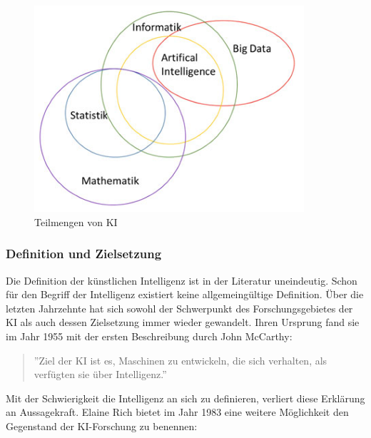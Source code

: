 \documentclass[a4paper,12pt, german]{report}
\begin{document}
\begin{figure}[H]
  \center
 \includegraphics[width=10cm]{images/KI-Teilmengen.png}
  \caption[Teilmengen von KI]{Teilmengen von KI \cite{17}}
\end{figure}


\subsubsection{Definition und Zielsetzung}
Die Definition der künstlichen Intelligenz ist in der Literatur uneindeutig. Schon für den Begriff der Intelligenz existiert keine allgemeingültige Definition. Über die letzten Jahrzehnte hat sich sowohl der Schwerpunkt des Forschungsgebietes der KI als auch dessen Zielsetzung immer wieder gewandelt. Ihren Ursprung fand sie im Jahr 1955 mit der ersten Beschreibung durch John McCarthy\cite{11}:
\begin{quote}
  ''Ziel der KI ist es, Maschinen zu entwickeln, die sich verhalten, als verfügten sie über Intelligenz.''
\end{quote}
Mit der Schwierigkeit die Intelligenz an sich zu definieren, verliert diese Erklärung an Aussagekraft. Elaine Rich bietet im Jahr 1983 eine weitere Möglichkeit den Gegenstand der KI-Forschung zu benennen: 
\end{document}
